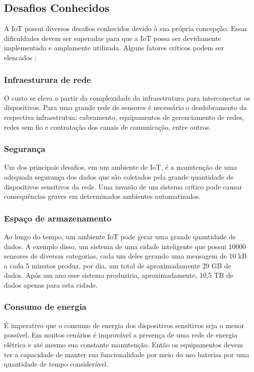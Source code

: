 
\subsection{Desafios Conhecidos}
	\quad A \acrlong{IoT} possui diversos desafios conhecidos devido à sua própria concepção. Essas dificuldades devem ser superadas para que a
	\acrshort{IoT} possa ser devidamente implementada e amplamente utilizada. Alguns fatores críticos podem ser elencados \cite{roadmap}:
	\subsubsection{Infraesturura de rede}
		\quad O custo se eleva a partir da complexidade da infraestrutura para interconectar os dispositivos. Para uma grande rede de sensores é necessário o desdobramento da respectiva infraestrutua:
		 cabeamento, equipamentos de gerenciamento de redes, redes sem fio e contratação dos canais de comunicação, entre outros.
	\subsubsection{Segurança}
		\quad Um dos principais desafios, em um ambiente de \acrlong{IoT}, é a manutenção de uma adequada segurança dos dados que são coletados pela grande quantidade de
		dispositivos sensitivos da rede. Uma invasão de um sistema crítico pode causar consequências graves em determinados ambientes automatizados.
  \subsubsection{Espaço de armazenamento}
	  \quad Ao longo do tempo, um ambiente \acrshort{IoT} pode gerar uma grande quantidade de dados. A exemplo disso, um sistema de uma cidade inteligente que possui 10000 sensores
 	  de diversas categorias, cada um deles gerando uma mensagem de 10 kB a cada 5 minutos produz, por dia, um total de aproximadamente 29 GB de dados.
	  Após um ano esse sistema produziria, aproximadamente, 10,5 TB de dados apenas para esta cidade.
  \subsubsection{Consumo de energia}
		\quad É imperativo que o consumo de energia dos dispositivos sensitivos seja o menor possível. Em muitos cenários é improvável a presença de uma
		rede de energia elétrica e até mesmo sua constante manutenção. Então os equipamentos devem ter a capacidade de manter sua funcionalidade por meio do uso baterias por
		uma quantidade de tempo considerável.



